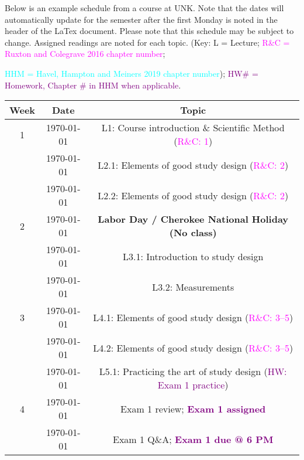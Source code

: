 \documentclass[11pt]{article}
\begin{document}
	\noindent Below is an example schedule from a course at UNK. Note that the dates will automatically update for the semester after the first Monday is noted in the header of the LaTex document. Please note that this schedule may be subject to change. Assigned readings are noted for each topic. (Key: L = Lecture; \textcolor{magenta}{R\&C = Ruxton and Colegrave 2016 chapter number}; {\textcolor{cyan}{HHM = Havel, Hampton and Meiners 2019 chapter number}); \textcolor{Purple}{HW\# = Homework, Chapter \# in HHM when applicable}.
	
	\SetDate[\startdate]
	
	
	\begin{center}
		\begin{longtable}{| c | c | c |}
			\hline
			\textbf{Week} & \textbf{Date} & \textbf{Topic} \\
			\hline
			\endhead
			1 & \printyearoff\today & L1: Course introduction \& Scientific Method (\textcolor{magenta}{R\&C: 1}) \\
			 & \printyearoff\AdvanceDate[2]\today & L2.1: Elements of good study design (\textcolor{magenta}{R\&C: 2}) \\
			  & \printyearoff\AdvanceDate[4]\today & L2.2: Elements of good study design (\textcolor{magenta}{R\&C: 2}) \\
			\hline
			2 & \printyearoff\AdvanceDate[\fpeval{(7*1)+0}]\today & \textbf{Labor Day / Cherokee National Holiday (No class)} \\
			 & \printyearoff\AdvanceDate[\fpeval{(7*1)+2}]\today & L3.1: Introduction to study design \\
			  & \printyearoff\AdvanceDate[\fpeval{(7*1)+4}]\today & L3.2: Measurements \\
			\hline
			3 & \printyearoff\AdvanceDate[\fpeval{(7*2)+0}]\today &  L4.1: Elements of good study design (\textcolor{magenta}{R\&C: 3--5}) \\
			& \printyearoff\AdvanceDate[\fpeval{(7*2)+2}]\today & L4.2: Elements of good study design (\textcolor{magenta}{R\&C: 3--5}) \\
			& \printyearoff\AdvanceDate[\fpeval{(7*2)+4}]\today & L5.1: Practicing the art of study design (\textcolor{purple}{HW: Exam 1 practice}) \\
			\hline
			4 & \printyearoff\AdvanceDate[\fpeval{(7*3)+0}]\today & Exam 1 review; \textcolor{purple}{\textbf{Exam 1 assigned}} \\
			& \printyearoff\AdvanceDate[\fpeval{(7*3)+2}]\today & Exam 1 Q\&A;  \textcolor{purple}{\textbf{Exam 1 due @ 6 PM}}\\

\end{longtable}
\end{center}}
\end{document}
